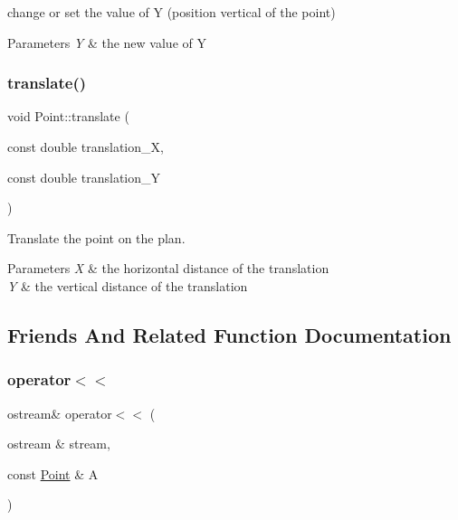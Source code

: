 change or set the value of Y (position vertical of the point) 


\begin{DoxyParams}{Parameters}
{\em Y} & the new value of Y \\
\hline
\end{DoxyParams}
\hypertarget{class_point_a57287a060ea145f69d3d4eb484e64d64}{}\label{class_point_a57287a060ea145f69d3d4eb484e64d64} 
\subsubsection{\texorpdfstring{translate()}{translate()}}
{\footnotesize\ttfamily void Point\+::translate (\begin{DoxyParamCaption}\item[{const double}]{translation\+\_\+X,  }\item[{const double}]{translation\+\_\+Y }\end{DoxyParamCaption})}



Translate the point on the plan. 


\begin{DoxyParams}{Parameters}
{\em X} & the horizontal distance of the translation \\
\hline
{\em Y} & the vertical distance of the translation \\
\hline
\end{DoxyParams}


\subsection{Friends And Related Function Documentation}
\hypertarget{class_point_a2cb585eaed961c31bb595dfa36f98bf8}{}\label{class_point_a2cb585eaed961c31bb595dfa36f98bf8} 
\subsubsection{\texorpdfstring{operator$<$$<$}{operator<<}}
{\footnotesize\ttfamily ostream\& operator$<$$<$ (\begin{DoxyParamCaption}\item[{ostream \&}]{stream,  }\item[{const \hyperlink{class_point}{Point} \&}]{A }\end{DoxyParamCaption})\hspace{0.3cm}{\ttfamily [friend]}}



